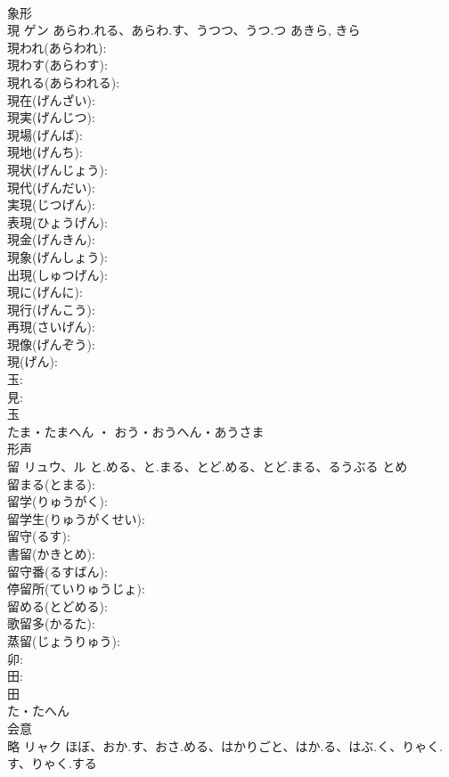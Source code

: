 \documentclass[8pt]{extreport}
\begin{document}
\begin{CJK}{UTF8}{min}
\\	象形 
\\	現	ゲン	あらわ.れる、あらわ.す、うつつ、うつ.つ	あきら, きら	
\\	現われ(あらわれ): 
\\	現わす(あらわす): 
\\	現れる(あらわれる): 
\\	現在(げんざい): 
\\	現実(げんじつ): 
\\	現場(げんば): 
\\	現地(げんち): 
\\	現状(げんじょう): 
\\	現代(げんだい): 
\\	実現(じつげん): 
\\	表現(ひょうげん): 
\\	現金(げんきん): 
\\	現象(げんしょう): 
\\	出現(しゅつげん): 
\\	現に(げんに): 
\\	現行(げんこう): 
\\	再現(さいげん): 
\\	現像(げんぞう): 
\\	現(げん): 
\\	玉: 
\\	見: 
\\	玉	
\\	たま・たまへん ・ おう・おうへん・あうさま	
\\	形声 
\\	留	リュウ、ル	と.める、と.まる、とど.める、とど.まる、るうぶる	とめ	
\\	留まる(とまる): 
\\	留学(りゅうがく): 
\\	留学生(りゅうがくせい): 
\\	留守(るす): 
\\	書留(かきとめ): 
\\	留守番(るすばん): 
\\	停留所(ていりゅうじょ): 
\\	留める(とどめる): 
\\	歌留多(かるた): 
\\	蒸留(じょうりゅう): 
\\	卯: 
\\	田: 
\\	田	
\\	た・たへん	
\\	会意 
\\	略	リャク	ほぼ、おか.す、おさ.める、はかりごと、はか.る、はぶ.く、りゃく.す、りゃく.する		

\end{CJK}
\end{document}
